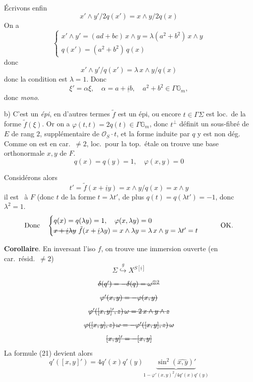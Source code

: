 \documentclass[11pt,a4paper]{article}
\begin{document}
Écrivons enfin
\[
x'\wedge y'/2q(x')=x\wedge y/2q(x)
\]
On a
\[
\begin{cases}
x'\wedge y'=(ad+bc)\,x\wedge y=\lambda(a^2+b^2)\,x\wedge y\\
q(x')=(a^2+b^2)\,q(x)
\end{cases}
\]
donc
\[
x'\wedge y'/q(x')=\lambda\,x\wedge y/q(x)
\]
donc la condition est $\lambda=1$. Donc
\[
\xi'=\alpha\xi,\quad \alpha=a+\underline{i}b,\quad a^2+b^2\in\Gamma\mathbb{G}_m,
\]
donc \emph{mono}.

b) C'est un \emph{épi}, en d'autres termes  $\tilde f$ est un épi, ou encore \uncertain{$\forall$} $t\in\Gamma\Sigma$ est loc.\ de la forme $\tilde f(\xi)$. Or on a $\varphi(t,t)=2q(t)\in\Gamma\mathbb{G}_m$, donc $t^{\perp}$ définit un sous-fibré  de $E$ de rang $2$,  supplémentaire de $\mathcal{O}_S\cdot t$,  et la forme induite par $q$ y est non dég. Comme on est en car.\ $\neq 2$, loc.\ pour la top.\ étale on trouve une base orthonormale $x,y$ de $F$.
\[
q(x)=q(y)=1,\quad \varphi(x,y)=0
\]

Considérons alors
\[
t'=\tilde f(x+\underline{i}y)=x\wedge y/q(x)=x\wedge y
\]
 il est \ à $F$ (donc $t$ de la forme $t=\lambda t'$, de plus $q(t)=q(\lambda t')=-1$, donc $\lambda^2=1$. 
\[
\text{Donc}\quad
\begin{cases}
q(x)=q(\lambda y)=1,\quad \varphi(x,\lambda y)=0\\
\text{\struck{$x+\underline{i}\lambda y$}}\ \tilde f(x+\underline{i}\lambda y)=x\wedge\lambda y=\lambda\,x\wedge y=\lambda t'=t
\end{cases}
\qquad \text{OK.}
\]

\textbf{Corollaire}. En inversant l'iso $f$, on trouve une immersion ouverte (en car.\ résid.\ $\neq 2$)
\[
\Sigma\overset{g}{\hookrightarrow}X^{S[\underline{i}]} \tag{24}
\]

\[
\text{\struck{$\delta(q')=-\delta(q)=\omega^{\otimes 2}$}}
\]
   
\[
\text{\struck{$\varphi'(x,y)=-\varphi(x,y)$}}
\]
\[
\text{\struck{$\varphi'([x,y]',z)\,\omega=2\,x\wedge y\wedge z$}}
\]
\[
\text{\struck{$\varphi([x,y],z)\,\omega=-\varphi'([x,y],z)\,\omega$}}
\]
\[
\text{\struck{$[x,y]'=-[x,y]$}}
\]
La formule (21) devient alors
\[
q'([x,y]')=4q'(x)q'(y)\underbrace{\sin^2(\widehat{x,y})'}_{1-\varphi'(x,y)^2/4q'(x)q'(y)} \tag{25}
\]
\end{document}
